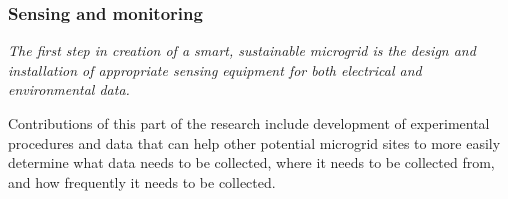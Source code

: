 
\subsubsection{Sensing and monitoring}

{\em The first step in creation of a smart, sustainable microgrid is the
  design and installation of appropriate sensing equipment for both
  electrical and environmental data.  

  Contributions of this part of the research
  include development of experimental procedures and data that can help other
  potential microgrid sites to more easily determine what data needs to be
  collected, where it needs to be collected from, and how frequently it
  needs to be collected. }



